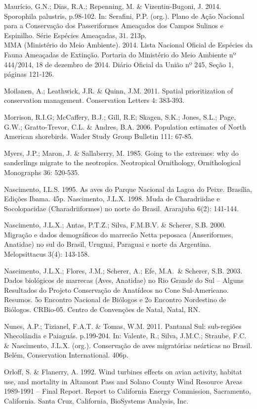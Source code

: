 \documentclass[
  oneside]{scrbook}
\begin{document}
Maurício, G.N.; Dias, R.A.; Repenning, M. \& Vizentin-Bugoni, J. 2014. Sporophila palustris, p.98-102. In: Serafini, P.P. (org.). Plano de Ação Nacional para a Conservação dos Passeriformes Ameaçados dos Campos Sulinos e Espinilho. Série Espécies Ameaçadas, 31. 213p.\\
MMA (Ministério do Meio Ambiente). 2014. Lista Nacional Oficial de Espécies da Fauna Ameaçadas de Extinção. Portaria do Ministério do Meio Ambiente nº 444/2014, 18 de dezembro de 2014. Diário Oficial da União nº 245, Seção 1, páginas 121-126.

Moilanen, A.; Leathwick, J.R. \& Quinn, J.M. 2011. Spatial prioritization of conservation management. Conservation Letters 4: 383-393.

Morrison, R.I.G; McCaffery, B.J.; Gill, R.E; Skagen, S.K.; Jones, S.L.; Page, G.W.; Gratto-Trevor, C.L. \& Andres, B.A. 2006. Population estimates of North American shorebirds. Wader Study Group Bulletin 111: 67-85.

Myers, J.P.; Maron, J. \& Sallaberry, M. 1985. Going to the extremes: why do sanderlings migrate to the neotropics. Neotropical Ornithology, Ornithological Monographs 36: 520-535.

Nascimento, I.L.S. 1995. As aves do Parque Nacional da Lagoa do Peixe. Brasília, Edições Ibama. 45p.
Nascimento, J.L.X. 1998. Muda de Charadriidae e Socolopacidae (Charadriiformes) no norte do Brasil. Ararajuba 6(2): 141-144.

Nascimento, J.L.X.; Antas, P.T.Z.; Silva, F.M.B.V. \& Scherer, S.B. 2000. Migração e dados demográficos do marrecão Netta peposaca (Anseriformes, Anatidae) no sul do Brasil, Uruguai, Paraguai e norte da Argentina. Melopsittacus 3(4): 143-158.

Nascimento, J.L.X.; Flores, J.M.; Scherer, A.; Efe, M.A.~\& Scherer, S.B. 2003. Dados biológicos de marrecas (Aves, Anatidae) no Rio Grande do Sul -- Alguns Resultados do Projeto Conservação de Anatídeos no Cone Sul-Americano. Resumos. 5o Encontro Nacional de Biólogos e 2o Encontro Nordestino de Biólogos. CRBio-05. Centro de Convenções de Natal, Natal, RN.

Nunes, A.P.; Tizianel, F.A.T. \& Tomas, W.M. 2011. Pantanal Sul: sub-regiões Nhecolândia e Paiaguás. p.199-204. In: Valente, R.; Silva, J.M.C.; Straube, F.C. \& Nascimento, J.L.X. (org.). Conservação de aves migratórias neárticas no Brasil. Belém, Conservation International. 406p.

Orloff, S. \& Flanerry, A. 1992. Wind turbines effects on avian activity, habitat use, and mortality in Altamont Pass and Solano County Wind Resource Areas 1989-1991 -- Final Report. Report to California Energy Commission, Sacramento, California. Santa Cruz, California, BioSystems Analysis, Inc.~
\end{document}
